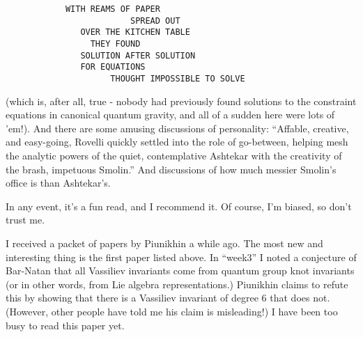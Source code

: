 \documentclass{article}
\renewcommand{\texttt}[1]{%
  \begingroup
  \ttfamily
  \begingroup\lccode`~=`/\lowercase{\endgroup\def~}{/\discretionary{}{}{}}%
  \begingroup\lccode`~=`[\lowercase{\endgroup\def~}{[\discretionary{}{}{}}%
  \begingroup\lccode`~=`.\lowercase{\endgroup\def~}{.\discretionary{}{}{}}%
  \catcode`/=\active\catcode`[=\active\catcode`.=\active
  \scantokens{#1\noexpand}%
  \endgroup
}
\begin{document}
\begin{verbatim}
            WITH REAMS OF PAPER
                         SPREAD OUT
               OVER THE KITCHEN TABLE
                 THEY FOUND
               SOLUTION AFTER SOLUTION
               FOR EQUATIONS
                     THOUGHT IMPOSSIBLE TO SOLVE
\end{verbatim}

(which is, after all, true - nobody had previously found solutions to
the constraint equations in canonical quantum gravity, and all of a
sudden here were lots of 'em!). And there are some amusing discussions
of personality: ``Affable, creative, and easy-going, Rovelli quickly
settled into the role of go-between, helping mesh the analytic powers of
the quiet, contemplative Ashtekar with the creativity of the brash,
impetuous Smolin.'' And discussions of how much messier Smolin's office
is than Ashtekar's.

In any event, it's a fun read, and I recommend it. Of course, I'm
biased, so don't trust me.


I received a packet of papers by Piunikhin a while ago. The most new and
interesting thing is the first paper listed above. In ``week3'' I noted
a conjecture of Bar-Natan that all Vassiliev invariants come from
quantum group knot invariants (or in other words, from Lie algebra
representations.) Piunikhin claims to refute this by showing that there
is a Vassiliev invariant of degree 6 that does not. (However, other
people have told me his claim is misleading!) I have been too busy to
read this paper yet.
\end{document}
